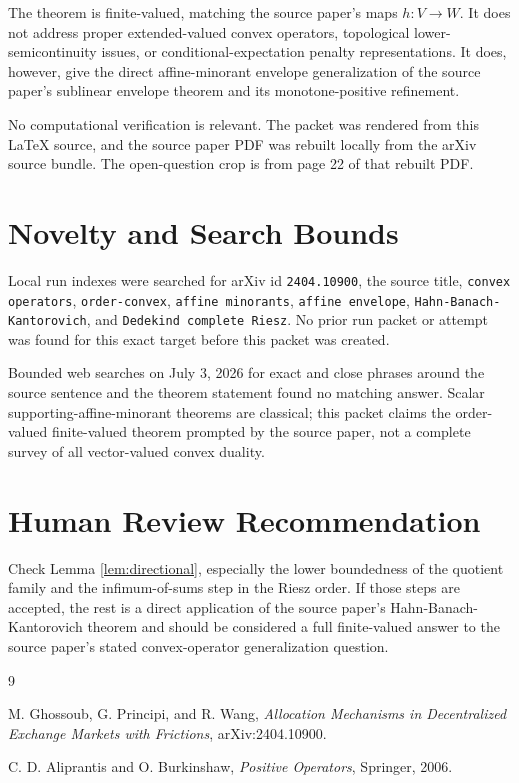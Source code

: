 \documentclass[11pt]{article}
\begin{document}
The theorem is finite-valued, matching the source paper's maps $h:V\to W$.
It does not address proper extended-valued convex operators, topological
lower-semicontinuity issues, or conditional-expectation penalty
representations. It does, however, give the direct affine-minorant envelope
generalization of the source paper's sublinear envelope theorem and its
monotone-positive refinement.

No computational verification is relevant. The packet was rendered from this
LaTeX source, and the source paper PDF was rebuilt locally from the arXiv
source bundle. The open-question crop is from page 22 of that rebuilt PDF.

\section*{Novelty and Search Bounds}

Local run indexes were searched for arXiv id \texttt{2404.10900}, the source
title, \texttt{convex operators}, \texttt{order-convex},
\texttt{affine minorants}, \texttt{affine envelope},
\texttt{Hahn-Banach-Kantorovich}, and \texttt{Dedekind complete Riesz}. No
prior run packet or attempt was found for this exact target before this packet
was created.

Bounded web searches on July 3, 2026 for exact and close phrases around the
source sentence and the theorem statement found no matching answer. Scalar
supporting-affine-minorant theorems are classical; this packet claims the
order-valued finite-valued theorem prompted by the source paper, not a
complete survey of all vector-valued convex duality.

\section*{Human Review Recommendation}

Check Lemma \ref{lem:directional}, especially the lower boundedness of the
quotient family and the infimum-of-sums step in the Riesz order. If those
steps are accepted, the rest is a direct application of the source paper's
Hahn-Banach-Kantorovich theorem and should be considered a full finite-valued
answer to the source paper's stated convex-operator generalization question.

\begin{thebibliography}{9}

M. Ghossoub, G. Principi, and R. Wang,
\emph{Allocation Mechanisms in Decentralized Exchange Markets with Frictions},
arXiv:2404.10900.

C. D. Aliprantis and O. Burkinshaw,
\emph{Positive Operators},
Springer, 2006.

\end{thebibliography}
\end{document}
